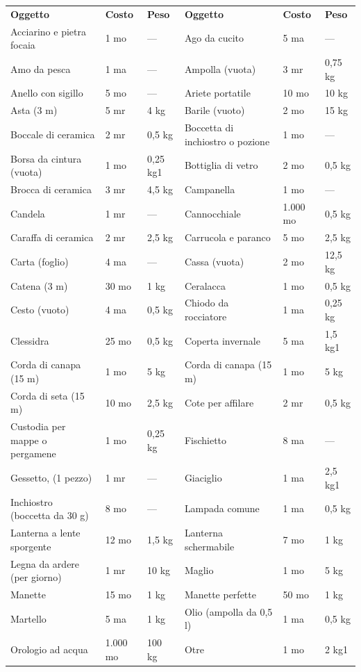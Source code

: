 \documentclass[a4paper,11pt,twoside,openany]{dndbook}
\begin{document}
{\begin{supertabular}{|L{4cm} |k{1.5cm} |k{1.5cm}|L{5cm} |k{1.5cm} |k{1.5cm}|}
	\textbf{Oggetto}&	\textbf{Costo}	& \textbf{Peso}&\textbf{Oggetto}&	\textbf{Costo}	&\textbf{Peso}\\
Acciarino e pietra focaia	&1 mo&	— & 	Ago da cucito&	5 ma&	—\\
Amo da pesca&	1 ma&	—&	Ampolla (vuota)&	3 mr&	0,75 kg\\
Anello con sigillo&	5 mo&	—&	Ariete portatile&	10 mo	&10 kg\\
Asta (3 m)&	5 mr&	4 kg&	Barile (vuoto)&	2 mo&	15 kg\\
Boccale di ceramica	&2 mr&	0,5 kg&	Boccetta di inchiostro o pozione&	1 mo&	—\\
Borsa da cintura (vuota)&	1 mo&	0,25 kg1&	Bottiglia di vetro&	2 mo&	0,5 kg\\
Brocca di ceramica&	3 mr&	4,5 kg&	Campanella&	1 mo&	—\\
Candela&	1 mr&	—&	Cannocchiale&	1.000 mo&	0,5 kg\\
Caraffa di ceramica&	2 mr&	2,5 kg&	Carrucola e paranco&	5 mo&	2,5 kg\\
Carta (foglio)&	4 ma&	—&	Cassa (vuota)&	2 mo&	12,5 kg\\
Catena (3 m)&	30 mo&	1 kg&	Ceralacca&	1 mo&	0,5 kg\\
Cesto (vuoto)&	4 ma&	0,5 kg&	Chiodo da rocciatore&	1 ma&	0,25 kg\\
Clessidra&	25 mo	&0,5 kg&	Coperta invernale&	5 ma&	1,5 kg1\\
Corda di canapa (15 m)	&1 mo&	5 kg&	Corda di canapa (15 m)&1 mo&5 kg\\
Corda di seta (15 m)&10 mo&2,5 kg&	Cote per affilare&2 mr&0,5 kg\\
Custodia per mappe o pergamene&1 mo&0,25 kg&	Fischietto&8 ma&—\\
Gessetto, (1 pezzo)&1 mr&—&	Giaciglio&1 ma&2,5 kg1\\
Inchiostro (boccetta da 30 g)&8 mo&—&	Lampada comune&1 ma&0,5 kg\\
Lanterna a lente sporgente&12 mo&1,5 kg&	Lanterna schermabile&7 mo&1 kg\\
Legna da ardere (per giorno)&1 mr&10 kg&	Maglio&1 mo&5 kg\\
Manette&15 mo&1 kg&	Manette perfette&50 mo&1 kg\\
Martello&5 ma&1 kg&	Olio (ampolla da 0,5 l)&1 ma&0,5 kg\\
Orologio ad acqua&1.000 mo&100 kg&	Otre&1 mo&2 kg1\\

\end{supertabular}}
\end{document}

